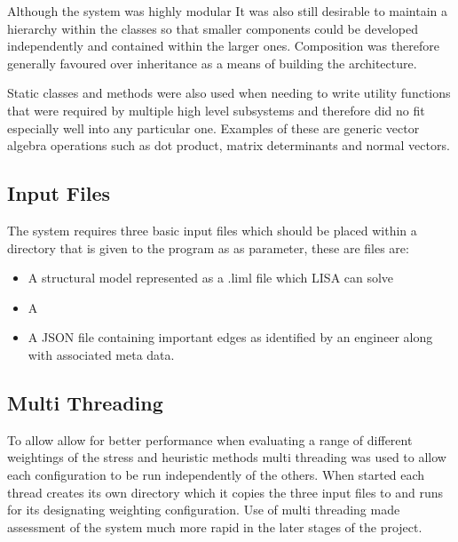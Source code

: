 \documentclass{article}
\begin{document}
Although the system was highly modular It was also still desirable to maintain a hierarchy within the classes so that smaller components could be developed independently and contained within the larger ones. Composition was therefore generally favoured over inheritance as a means of building the architecture. 

Static classes and methods were also used when needing to write utility functions that were required by multiple high level subsystems and therefore did no fit especially well into any particular one. Examples of these are generic vector algebra operations such as dot product, matrix determinants and normal vectors.



\subsection{Input Files}
The system requires three basic input files which should be placed within a directory that is given to the program as as parameter, these are files are:

\begin{itemize}
\item A structural model represented as a .liml file which LISA can solve
\item A 
\item A JSON file containing important edges as identified by an engineer 
along with associated meta data.
\end{itemize}


\subsection{Multi Threading}
To allow allow for better performance when evaluating a range of different weightings of the stress and heuristic methods multi threading was used to allow each configuration to be run independently of the others. When started each thread creates its own directory which it copies the three input files to and runs for its designating weighting configuration. Use of multi threading made assessment of the system much more rapid in the later stages of the project.
\end{document}
